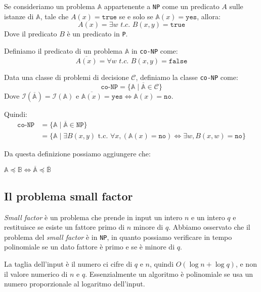 Se consideriamo un problema $\mathbb{A}$ appartenente a \texttt{NP} come un predicato $A$ sulle istanze di 
$\mathbb{A}$, tale che $A(x) = \texttt{true}$ se e solo se $\mathbb{A}(x) = \texttt{yes}$, allora:
\[
  A(x) = \exists w \textit{ t.c. } B(x, y) = \texttt{true}
\]
Dove il predicato $B$ è un predicato in \texttt{P}.

Definiamo il predicato di un problema $\mathbb{A}$ in \texttt{co-NP} come:
\[
  \overline{A(x)} = \forall w \textit{ t.c. } B(x, y) = \texttt{false}
\]

\begin{tcolorbox}[title = Problema \texttt{co-NP}]
    Data una classe di problemi di decisione $\mathcal{C}$, definiamo la classe \texttt{co-NP} come:
    \[
        \texttt{co-NP} = \{ \mathbb{A} \mid \overline{\mathbb{A}} \in \mathcal{C} \}
    \]
    Dove $\mathcal{I}(\overline{\mathbb{A}}) = \mathcal{I}(\mathbb{A})$ e 
    $\overline{\mathbb{A}(x)} = \texttt{yes} \iff \mathbb{A}(x) = \texttt{no}$.
    
    Quindi:
    \[
        \begin{aligned}
        \texttt{co-NP} &= \{ \mathbb{A} \mid \overline{\mathbb{A}} \in \texttt{NP} \} \\
                       &= \{ \mathbb{A} \mid \exists B(x, y) \text{ t.c. } \forall x, (\mathbb{A}(x) = \texttt{no}) \iff \exists w, B(x, w) = \texttt{no} \}
        \end{aligned}
    \]
\end{tcolorbox}
Da questa definizione possiamo aggiungere che:

\begin{theorem}
    $\mathbb{A} \preceq \mathbb{B} \iff \overline{\mathbb{A}} \preceq \overline{\mathbb{B}}$
\end{theorem}

\subsection{Il problema small factor}
\textit{Small factor} è un problema che prende in input un intero $n$ e un intero $q$ e restituisce 
se esiste un fattore primo di $n$ minore di $q$. 
Abbiamo osservato che il problema del \textit{small factor} è in \texttt{NP}, in quanto possiamo
verificare in tempo polinomiale se un dato fattore è primo e se è minore di $q$.

La taglia dell'input è il numero ci cifre di $q$ e $n$, quindi $O(\log n + \log q)$, e non il valore 
numerico di $n$ e $q$. Essenzialmente un algoritmo è polinomiale se usa un numero proporzionale al
logaritmo dell'input.

